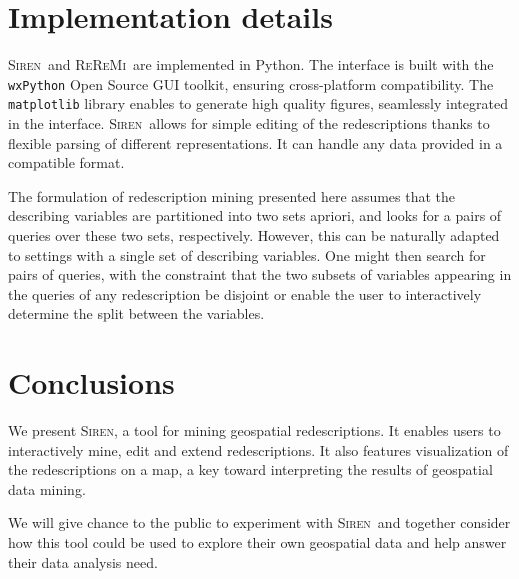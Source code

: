 \documentclass{sig-alternate}
\newcommand{\Siren}{\textsc{Siren}}
\newcommand{\ReReMi}{\textsc{ReReMi}}
\begin{document}

\section{Implementation details}
\Siren\ and \ReReMi\ are implemented in Python.  The interface is
built with the \texttt{wxPython} Open Source GUI toolkit, ensuring
cross-platform compatibility.  The \texttt{matplotlib} library enables
to generate high quality figures, seamlessly integrated in the
interface.  \Siren\ allows for simple editing of the redescriptions
thanks to flexible parsing of different representations. It can handle
any data provided in a compatible format.

The formulation of redescription mining presented here assumes that
the describing variables are partitioned into two sets apriori, and
looks for a pairs of queries over these two sets, respectively.
However, this can be naturally adapted to settings with a single set
of describing variables.  One might then search for pairs of queries,
with the constraint that the two subsets of variables appearing in the
queries of any redescription be disjoint or enable the user to
interactively determine the split between the variables.

\section{Conclusions}
We present \Siren, a tool for mining geospatial redescriptions. It enables
users to interactively mine, edit and extend redescriptions. It also
features visualization of the redescriptions on a map, a key toward
interpreting the results of geospatial data mining.

We will give chance to the public to experiment with \Siren\ and
together consider how this tool could be used to explore their own geospatial
data and help answer their data analysis need.


  
\balancecolumns

\end{document}
